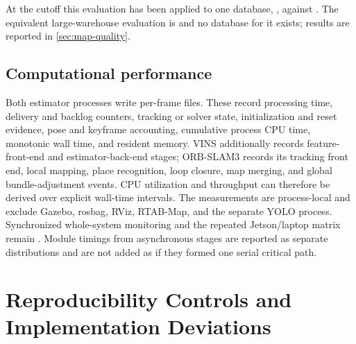 At the cutoff this evaluation has been applied to one database,
, against
. The
equivalent large-warehouse evaluation is  and no database for
it exists; results are reported in \cref{sec:map-quality}.

\subsection{Computational performance}

Both estimator processes write per-frame  files. These
record processing time, delivery and backlog counters, tracking or solver state,
initialization and reset evidence, pose and keyframe accounting, cumulative
process CPU time, monotonic wall time, and resident memory. VINS additionally
records feature-front-end and estimator-back-end stages; ORB-SLAM3 records its
tracking front end, local mapping, place recognition, loop closure, map merging,
and global bundle-adjustment events. CPU utilization and throughput can therefore
be derived over explicit wall-time intervals. The measurements are process-local
and exclude Gazebo, rosbag, RViz, RTAB-Map, and the separate YOLO process.
Synchronized whole-system monitoring and the repeated Jetson/laptop matrix
remain . Module timings from asynchronous stages are reported as
separate distributions and are not added as if they formed one serial critical
path.

\section{Reproducibility Controls and Implementation Deviations}
\label{sec:reproducibility-deviations}

